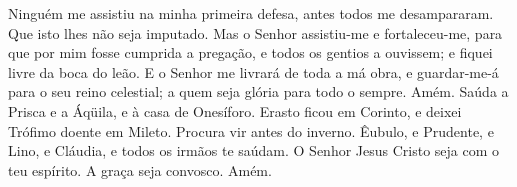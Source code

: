 Ninguém me assistiu na minha primeira defesa, antes todos me
desampararam. Que isto lhes não seja imputado. Mas o Senhor
assistiu-me e fortaleceu-me, para que por mim fosse cumprida a
pregação, e todos os gentios a ouvissem; e fiquei livre da boca do
leão. E o Senhor me livrará de toda a má obra, e guardar-me-á
para o seu reino celestial; a quem seja glória para todo o sempre.
Amém. Saúda a Prisca e a Áqüila, e à casa de Onesíforo.
Erasto ficou em Corinto, e deixei Trófimo doente em Mileto.
Procura vir antes do inverno. Êubulo, e Prudente, e Lino, e
Cláudia, e todos os irmãos te saúdam. O Senhor Jesus Cristo
seja com o teu espírito. A graça seja convosco. Amém.

